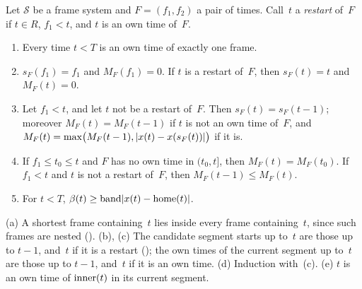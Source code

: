\begin{lemma}\label{lem:dynamics}
Let $\mathcal S$ be a frame system and $F=(f_1,f_2)$ a pair of times. Call~$t$ a \emph{restart} of~$F$ if $t\in R$, $f_1<t$,
and $t$ is an own time of~$F$.
\begin{enumerate}[label=(\alph*)]
\item Every time $t<T$ is an own time of exactly one frame.
\item $s_F(f_1)=f_1$ and $M_F(f_1)=0$. If $t$ is a restart of~$F$, then $s_F(t)=t$ and $M_F(t)=0$.
\item Let $f_1<t$, and let $t$ not be a restart of~$F$. Then $s_F(t)=s_F(t-1)$; moreover $M_F(t)=M_F(t-1)$ if $t$ is not an
own time of~$F$, and $M_F(t)=\max\bigl(M_F(t-1),\lvert x(t)-x(s_F(t)) \rvert\bigr)$ if it is.
\item If $f_1\le t_0\le t$ and $F$ has no own time in $(t_0,t]$, then $M_F(t)=M_F(t_0)$. If $f_1<t$ and $t$ is not a
restart of~$F$, then $M_F(t-1)\le M_F(t)$.
\item For $t<T$, $\beta(t)\ge\operatorname{band}\lvert x(t)-\operatorname{home}(t) \rvert$.
\end{enumerate}
\end{lemma}

\begin{outline}
(a) A shortest frame containing~$t$ lies inside every frame containing~$t$, since such frames are nested
(). (b), (c) The candidate segment starts up to~$t$ are those up to $t-1$, and~$t$ if it is
a restart (); the own times of the current segment up to~$t$ are those up to $t-1$, and~$t$ if it
is an own time. (d) Induction with~(c). (e) $t$ is an own time of $\operatorname{inner}(t)$ in its current segment.
\end{outline}

